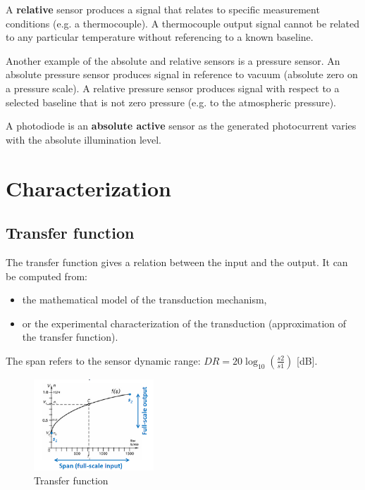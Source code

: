 \begin{mydef}
A \textbf{relative} sensor produces a signal that relates to
specific measurement conditions (e.g. a thermocouple).
A thermocouple output signal cannot be related to any particular 
temperature without referencing to a known baseline. 
\end{mydef}

Another example of the absolute and relative sensors is a pressure sensor. An absolute pressure sensor produces signal in reference to vacuum (absolute zero on a pressure scale). A relative pressure sensor produces signal with respect to a selected baseline that is not zero pressure (e.g. to the atmospheric pressure).
\vspace{0.3cm}

A photodiode is an \textbf{absolute active} sensor as the generated photocurrent varies with the absolute illumination level. 

\section{Characterization}

\subsection{Transfer function}

The transfer function gives a relation between the input and the output. It can be computed from:
\begin{itemize}
    \item  the mathematical model of the transduction mechanism,
    \item or the experimental characterization of the transduction (approximation of the transfer function).
\end{itemize}
The span refers to the sensor dynamic range: $DR = 20 \log_{10} \left( \frac{s2}{s1} \right)$ [dB].

\begin{figure}[H]
    \centering
    \includegraphics[width = 0.4\textwidth]{L1/img/trans-func.PNG}
    \caption{Transfer function}
    \label{fig:trans-func}
\end{figure}

